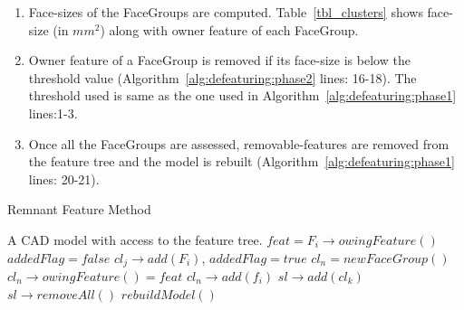 \begin{enumerate}
\item Face-sizes of the FaceGroups are computed. Table~\ref{tbl_clusters} shows face-size (in $mm^2$) along with owner feature of each FaceGroup.
\item Owner feature of a FaceGroup is removed if its face-size is below the threshold value (Algorithm~\ref{alg:defeaturing:phase2} lines: 16-18). The threshold used is same as the one used in Algorithm~\ref{alg:defeaturing:phase1} lines:1-3.
\item Once all the FaceGroups are assessed, removable-features are removed from the feature tree and the model is rebuilt (Algorithm~\ref{alg:defeaturing:phase1} lines: 20-21).
\end{enumerate} 

\bigskip

\begin{algorithm}[H]
	\caption{Remnant Feature Method}
	\label{alg:defeaturing:phase2}
	\begin{algorithmic}[1]
		\REQUIRE A CAD model with access to the feature tree. 
			\STATE $feat = F_i \rightarrow owingFeature()$
			\STATE $addedFlag = false$
					\STATE  $cl_j \rightarrow add(F_i)$, $addedFlag = true$
				\ENDIF
			\ENDWHILE
				\STATE  $cl_n = newFaceGroup()$
				\STATE  $cl_n \rightarrow owingFeature() = feat$
				\STATE  $cl_n \rightarrow add(f_i)$
			\ENDIF
		\ENDWHILE
				\STATE   $sl \rightarrow add(cl_k)$
			\ENDIF			
		\ENDWHILE
		\STATE  $sl \rightarrow removeAll()$
		\STATE  $rebuildModel()$
	\end{algorithmic}
\end{algorithm}


\bigskip


